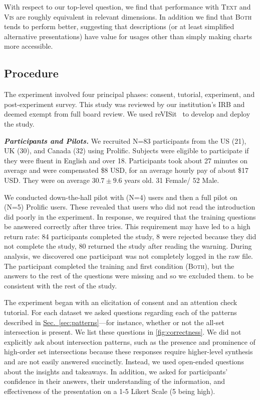 \documentclass{egpubl}
\newcommand{\secref}[1]{\hyperref[#1]{Sec.~\ref*{#1}}}
\newcommand{\numSurvey}{83}
\newcommand{\condition}[1]{\textsc{#1}}
\newcommand{\condVis}{\condition{Vis}}
\newcommand{\condText}{\condition{Text}}
\newcommand{\condBoth}{\condition{Both}}
\newcommand{\parahead}[1]
{\vspace{0.25em}\noindent \textbf{\textit{#1.}}}
\begin{document}
With respect to our top-level question, we find that performance with \condText{} and \condVis{} are roughly equivalent in relevant dimensions. In addition we find that \condBoth{} tends to perform better, suggesting that descriptions (or at least simplified alternative presentations) have value for usages other than simply making charts more accessible.






\subsection{Procedure}









The experiment involved four principal phases: consent, tutorial, experiment, and post-experiment survey.
This study was reviewed by our institution's IRB and deemed exempt from full board review.
We used reVISit~\cite{ding_revisit_2023} to develop and deploy the study.

\parahead{Participants and Pilots}
We recruited N=\numSurvey{} participants from the US (21), UK (30), and Canada (32) using Prolific.
Subjects were eligible to participate if they were fluent in English and over 18.
Participants took about 27 minutes on average and were compensated \$8 USD, for an average hourly pay of about \$17 USD.
They were on average $30.7 \pm 9.6$ years old. 31 Female/ 52 Male.

We conducted down-the-hall pilot with (N=4) users and then a full pilot on (N=5) Prolific users.
These revealed that users who did not read the introduction did poorly in the experiment.
In response, we required that the training questions be answered correctly after three tries.
This requirement may have led to a high return rate: 84 participants completed the study, 8 were rejected because they did not complete the study, 80 returned the study after reading the warning.
During analysis, we discovered one participant was not completely logged in the raw file. The participant completed the training and first condition (\condBoth{}), but the answers to the rest of the questions were missing and so we excluded them.
to be consistent with the rest of the study.




The experiment began with an elicitation of consent and an attention check tutorial.
For each dataset we asked questions regarding each of the patterns described in \secref{sec:patterns}---for instance, whether or not the all-set intersection is present. We list these questions in \autoref{fig:correctness}.
We did not explicitly ask about intersection patterns, such as the presence and prominence of high-order set intersections because these responses require higher-level synthesis and are not easily answered succinctly. Instead, we used open-ended questions about the insights and takeaways.
In addition, we asked for participants' confidence in their answers, their understanding of the information, and effectiveness of the presentation on a 1-5 Likert Scale (5 being high).
\end{document}
